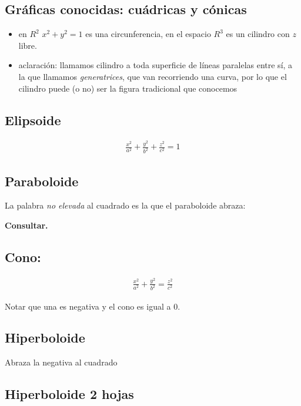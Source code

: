 \subsection{Gráficas conocidas: cuádricas y cónicas}

\begin{itemize}
    \item en \(R^{2}\) \(x^{2} + y^{2} = 1\) es una circunferencia,
          en el espacio \(R^{3}\) es un cilindro con \(z\) libre.
    \item aclaración: llamamos cilindro a toda superficie de líneas paralelas
          entre sí, a la que llamamos \textit{generatrices}, que van recorriendo una
          curva, por lo que el cilindro puede (o no) ser la figura tradicional que
          conocemos
\end{itemize}

\subsection{Elipsoide}

\begin{align*}
    \frac{x^{2}}{a^{2}} + \frac{y^{2}}{b^{2}} + \frac{z^{2}}{c^{2}} = 1
\end{align*}

\subsection{Paraboloide}

La palabra \textit{no elevada} al cuadrado es la que el paraboloide abraza:

\textbf{Consultar.}

\subsection{Cono:}

\begin{align*}
    \frac{x^{2}}{a^{2}} + \frac{y^{2}}{b^{2}} = \frac{z^{2}}{c^{2}}
\end{align*}

Notar que una es negativa y el cono es igual a 0.

\subsection{Hiperboloide}

Abraza la negativa al cuadrado

\subsection{Hiperboloide 2 hojas}

